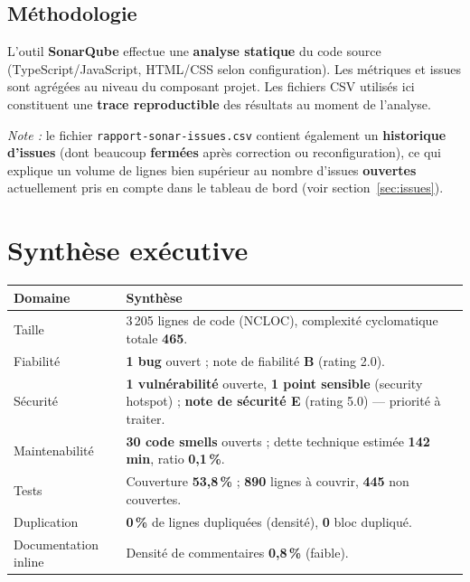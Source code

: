 \documentclass[11pt,a4paper]{article}
\begin{document}
\subsection{Méthodologie}

L'outil \textbf{SonarQube} effectue une \textbf{analyse statique} du code source (TypeScript/JavaScript, HTML/CSS selon configuration). Les métriques et issues sont agrégées au niveau du composant projet. Les fichiers CSV utilisés ici constituent une \textbf{trace reproductible} des résultats au moment de l'analyse.

\textit{Note :} le fichier \texttt{rapport-sonar-issues.csv} contient également un \textbf{historique d'issues} (dont beaucoup \textbf{fermées} après correction ou reconfiguration), ce qui explique un volume de lignes bien supérieur au nombre d'issues \textbf{ouvertes} actuellement pris en compte dans le tableau de bord (voir section~\ref{sec:issues}).

\section{Synthèse exécutive}

\begin{table}[h]
  \centering
  \begin{tabular}{@{}p{3.8cm}p{10cm}@{}}
    \toprule
    \textbf{Domaine} & \textbf{Synthèse} \\
    \midrule
    Taille & 3\,205 lignes de code (NCLOC), complexité cyclomatique totale \textbf{465}. \\
    Fiabilité & \textbf{1 bug} ouvert ; note de fiabilité \textbf{B} (rating 2.0). \\
    Sécurité & \textbf{1 vulnérabilité} ouverte, \textbf{1 point sensible} (security hotspot) ; \textbf{note de sécurité E} (rating 5.0) --- priorité à traiter. \\
    Maintenabilité & \textbf{30 code smells} ouverts ; dette technique estimée \textbf{142 min}, ratio \textbf{0,1\,\%}. \\
    Tests & Couverture \textbf{53,8\,\%} ; \textbf{890} lignes à couvrir, \textbf{445} non couvertes. \\
    Duplication & \textbf{0\,\%} de lignes dupliquées (densité), \textbf{0} bloc dupliqué. \\
    Documentation inline & Densité de commentaires \textbf{0,8\,\%} (faible). \\
    \bottomrule
  \end{tabular}
\end{table}
\end{document}
